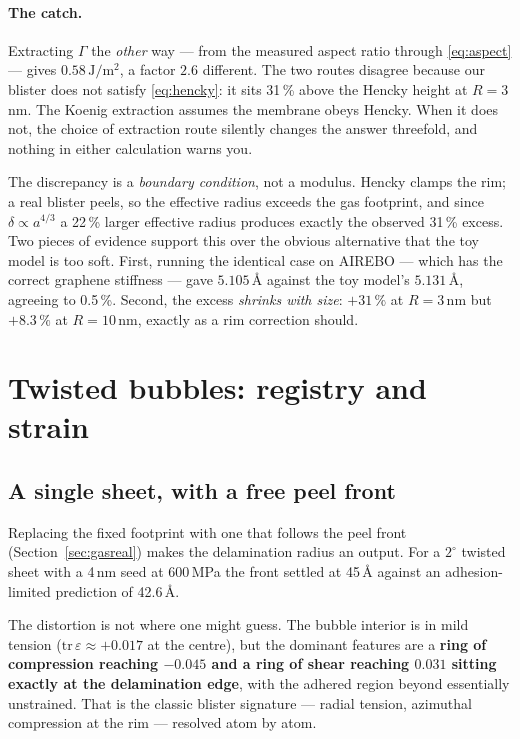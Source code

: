 \documentclass[11pt,a4paper]{article}
\begin{document}
\paragraph{The catch.} Extracting $\Gamma$ the \emph{other} way --- from the
measured aspect ratio through \eqref{eq:aspect} --- gives $0.58\,\mathrm{J/m^2}$,
a factor $2.6$ different. The two routes disagree because our blister does not
satisfy \eqref{eq:hencky}: it sits 31\,\% above the Hencky height at $R = 3$\,nm.
The Koenig extraction assumes the membrane obeys Hencky. When it does not, the
choice of extraction route silently changes the answer threefold, and nothing in
either calculation warns you.

The discrepancy is a \emph{boundary condition}, not a modulus. Hencky clamps the
rim; a real blister peels, so the effective radius exceeds the gas footprint, and
since $\delta \propto a^{4/3}$ a 22\,\% larger effective radius produces exactly
the observed 31\,\% excess. Two pieces of evidence support this over the obvious
alternative that the toy model is too soft. First, running the identical case on
AIREBO --- which has the correct graphene stiffness --- gave $5.105$\,\AA{}
against the toy model's $5.131$\,\AA, agreeing to 0.5\,\%. Second, the excess
\emph{shrinks with size}: $+31\,\%$ at $R = 3$\,nm but $+8.3\,\%$ at
$R = 10$\,nm, exactly as a rim correction should.

\section{Twisted bubbles: registry and strain}

\subsection{A single sheet, with a free peel front}

Replacing the fixed footprint with one that follows the peel front
(Section~\ref{sec:gasreal}) makes the delamination radius an output. For a
$2^\circ$ twisted sheet with a 4\,nm seed at 600\,MPa the front settled at
45\,\AA{} against an adhesion-limited prediction of 42.6\,\AA.

The distortion is not where one might guess. The bubble interior is in mild
tension ($\mathrm{tr}\,\varepsilon \approx +0.017$ at the centre), but the
dominant features are a \textbf{ring of compression reaching $-0.045$ and a ring
of shear reaching $0.031$ sitting exactly at the delamination edge}, with the
adhered region beyond essentially unstrained. That is the classic blister
signature --- radial tension, azimuthal compression at the rim --- resolved atom
by atom.
\end{document}

